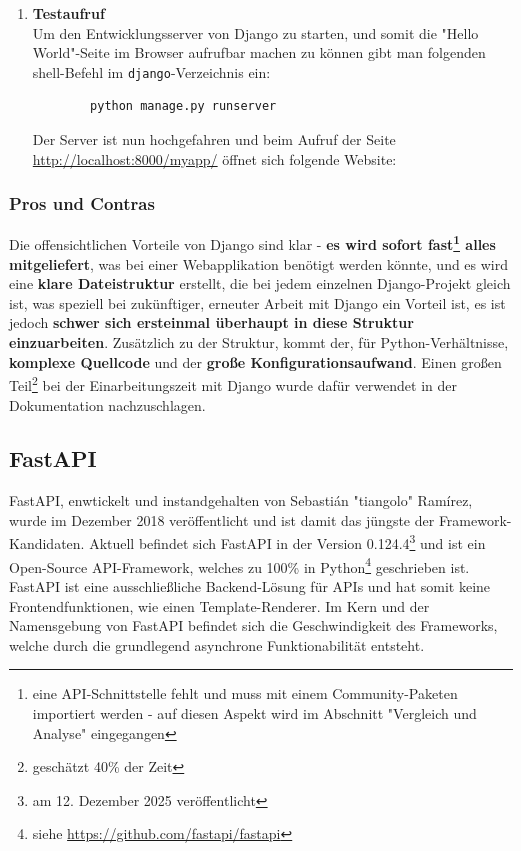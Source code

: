 \documentclass[letterpaper,11pt,leqno]{article}
\begin{document}
\begin{enumerate}
\begin{verbatim}
		urlpatterns = [
    		path("", views.index, name="index")
		]
	\end{verbatim}
	Als letzten Schritt muss nun noch die URL-Konfiguration des Projektes an sich korrekt gesetzt werden. Hierfür schreibt man
	folgenden Code in die Datei\\\verb|django/project/urls.py|:
	\begin{verbatim}
		from django.contrib import admin
		from django.urls import include, path

		urlpatterns = [
			path("myapp", include("myapp.urls")),
			path("admin", admin.site.urls)
		]
	\end{verbatim}
	\item\textbf{Testaufruf}\\Um den Entwicklungsserver von Django zu starten, und somit die "Hello World"-Seite im Browser
	aufrufbar machen zu können gibt man folgenden shell-Befehl im \verb|django|-Verzeichnis ein:
	\begin{verbatim}
		python manage.py runserver
	\end{verbatim}
	Der Server ist nun hochgefahren und beim Aufruf der Seite \url{http://localhost:8000/myapp/} öffnet sich folgende Website:
\end{enumerate}
\subsubsection{Pros und Contras}
Die offensichtlichen Vorteile von Django sind klar - \textbf{es wird sofort fast\footnote{eine API-Schnittstelle fehlt und muss mit
einem Community-Paketen importiert werden - auf diesen Aspekt wird im Abschnitt "Vergleich und Analyse" eingegangen} alles
mitgeliefert}, was bei einer Webapplikation benötigt werden könnte, und es wird eine \textbf{klare Dateistruktur} erstellt, die bei
jedem einzelnen Django-Projekt gleich ist, was speziell bei zukünftiger, erneuter Arbeit mit Django ein Vorteil ist, es ist jedoch
\textbf{schwer sich ersteinmal überhaupt in diese Struktur einzuarbeiten}. Zusätzlich zu der Struktur, kommt der, für
Python-Verhältnisse, \textbf{komplexe Quellcode} und der \textbf{große Konfigurationsaufwand}. Einen großen Teil\footnote{geschätzt
40\% der Zeit} bei der Einarbeitungszeit mit Django wurde dafür verwendet in der Dokumentation nachzuschlagen.

\subsection{FastAPI}
FastAPI, enwtickelt und instandgehalten von Sebastián "tiangolo" Ramírez, wurde im Dezember 2018 veröffentlicht und ist damit das
jüngste der Framework-Kandidaten. Aktuell befindet sich FastAPI in der Version 0.124.4\footnote{am 12. Dezember 2025 veröffentlicht}
und ist ein Open-Source API-Framework, welches zu 100\% in Python\footnote{siehe \url{https://github.com/fastapi/fastapi}}
geschrieben ist. FastAPI ist eine ausschließliche Backend-Lösung für APIs und hat somit keine Frontendfunktionen, wie einen
Template-Renderer. Im Kern und der Namensgebung von FastAPI befindet sich die Geschwindigkeit des Frameworks, welche durch die
grundlegend asynchrone Funktionabilität entsteht.
\end{document}
